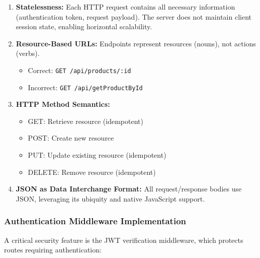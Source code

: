 \begin{enumerate}
    \item \textbf{Statelessness:} Each HTTP request contains all necessary information (authentication token, request payload). The server does not maintain client session state, enabling horizontal scalability.
    
    \item \textbf{Resource-Based URLs:} Endpoints represent resources (nouns), not actions (verbs).
    \begin{itemize}
        \item Correct: \texttt{GET /api/products/:id}
        \item Incorrect: \texttt{GET /api/getProductById}
    \end{itemize}
    
    \item \textbf{HTTP Method Semantics:}
    \begin{itemize}
        \item GET: Retrieve resource (idempotent)
        \item POST: Create new resource
        \item PUT: Update existing resource (idempotent)
        \item DELETE: Remove resource (idempotent)
    \end{itemize}
    
    \item \textbf{JSON as Data Interchange Format:} All request/response bodies use JSON, leveraging its ubiquity and native JavaScript support.
\end{enumerate}

\subsubsection{Authentication Middleware Implementation}

A critical security feature is the JWT verification middleware, which protects routes requiring authentication:

